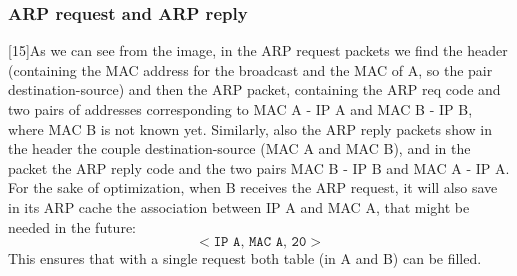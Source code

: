 \subsubsection{ARP request and ARP reply}
[15]As we can see from the image, in the ARP request packets we find the header (containing the MAC address for the broadcast and the MAC of A, so the pair destination-source) and then the ARP packet, containing the ARP req code and two pairs of addresses corresponding to MAC A - IP A and MAC B - IP B, where MAC B is not known yet. Similarly, also the ARP reply packets show in the header the couple destination-source (MAC A and MAC B), and in the packet the ARP reply code and the two pairs MAC B - IP B and MAC A - IP A. For the sake of optimization, when B receives the ARP request, it will also save in its ARP cache the association between IP A and MAC A, that might be needed in the future:
\[<\texttt{IP A, MAC A, 20}>\]
This ensures that with a single request both table (in A and B) can be filled.

